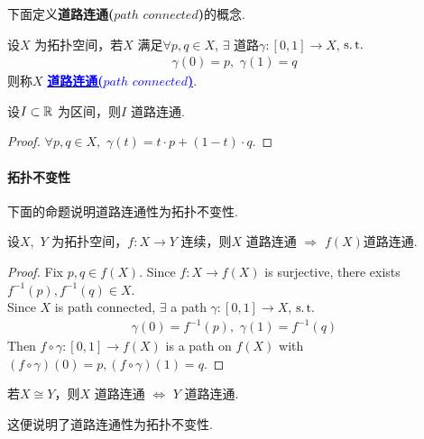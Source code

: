 	\vspace{2em}
	下面定义\textbf{道路连通($path \,\, connected$)}的概念.
	\begin{defn}\label{def 2.3.6}
		设$X$ 为拓扑空间，若$X$ 满足$\forall p , q \in X$, $\exists$ 道路$\gamma : [0 , 1] \longrightarrow X$, $\operatorname{s.t.}$
		\begin{align}
			\gamma(0) = p , \,\, \gamma(1) = q
		\end{align}
		则称$X$ \underline{\textcolor{blue}{\textbf{道路连通($path \,\, connected$)}}}.
		
		\vspace{2em}
		\begin{example}\label{ex 2.3.8}
			设$I \subset \mathbb{R}$ 为区间，则$I$ 道路连通.
			
			\begin{proof}
				$\forall p , q \in X, \,\, \gamma(t) = t \cdot p + (1 - t) \cdot q$.
			\end{proof}
		\end{example}
	\end{defn}

\vspace{2em}
\paragraph{拓扑不变性}
	下面的命题说明道路连通性为拓扑不变性.
	\begin{proposition}\label{prop 2.3.10}
		设$X , \,\, Y$ 为拓扑空间，$f : X \longrightarrow Y$ 连续，则$X$ 道路连通 $\Rightarrow$ $f(X)$道路连通.
		
		\vspace{2em}
		\begin{proof}
			Fix $p , q \in f(X)$. Since $f : X \longrightarrow f(X)$ is surjective, there exists $f^{-1}(p), f^{-1}(q) \in X$.\\
			Since $X$ is path connected, $\exists$ a path $\gamma : [0 , 1] \longrightarrow X$, $\operatorname{s.t.}$
			\begin{align}
				\gamma(0) = f^{-1}(p) , \,\, \gamma(1) = f^{-1}(q)
			\end{align}
			Then $f \circ \gamma : [0 , 1] \longrightarrow f(X)$ is a path on $f(X)$ with $(f \circ \gamma)(0) = p , (f \circ \gamma)(1) = q$.
		\end{proof}
	\end{proposition}
	
	\vspace{2em}
	\begin{corollary}\label{cor 2.3.2}
		若$X \cong Y$，则$X$ 道路连通 $\Leftrightarrow$ $Y$ 道路连通.
		\begin{rmk}
			这便说明了道路连通性为拓扑不变性.
		\end{rmk}
	\end{corollary}

